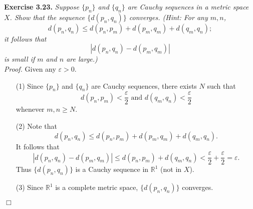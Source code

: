 \documentclass{article}
\begin{document}



\textbf{Exercise 3.23.}
\emph{Suppose $\{p_n\}$ and $\{q_n\}$ are Cauchy sequences in a metric space $X$.
Show that the sequence $\{d(p_n,q_n)\}$ converges.
(Hint: For any $m, n$,
$$d(p_n,q_n) \leq d(p_n,p_m) + d(p_m,q_m) + d(q_m,q_n);$$
it follows that
$$|d(p_n,q_n) - d(p_m,q_m)|$$
is small if $m$ and $n$ are large.)} \\

\emph{Proof.}
Given any $\varepsilon > 0$.
\begin{enumerate}
\item[(1)]
Since $\{p_n\}$ and $\{q_n\}$ are Cauchy sequences,
there exists $N$ such that
$$d(p_n,p_m) < \frac{\varepsilon}{2} \text{ and }
d(q_m,q_n) < \frac{\varepsilon}{2}$$ whenever $m, n \geq N$.
\item[(2)]
Note that
$$d(p_n,q_n) \leq d(p_n,p_m) + d(p_m,q_m) + d(q_m,q_n).$$
It follows that
$$|d(p_n,q_n) - d(p_m,q_m)|
\leq d(p_n,p_m) + d(q_m,q_n)
< \frac{\varepsilon}{2} + \frac{\varepsilon}{2}
= \varepsilon.$$
Thus $\{d(p_n,q_n)\}$ is a Cauchy sequence in $\mathbb{R}^1$ (not in $X$).
\item[(3)]
Since $\mathbb{R}^1$ is a complete metric space, $\{d(p_n,q_n)\}$ converges.
\end{enumerate}
$\Box$ \\\\



\end{document}

